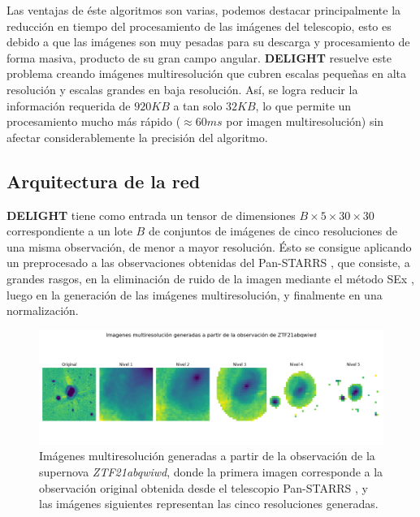\documentclass[../tesis.tex]{subfiles}
\begin{document}
Las ventajas de éste algoritmos son varias, podemos destacar principalmente la reducción en tiempo del procesamiento de las imágenes del telescopio, esto es debido a que las imágenes son muy pesadas para su descarga y procesamiento de forma masiva, producto de su gran campo angular. \textbf{DELIGHT} resuelve este problema creando imágenes multiresolución que cubren escalas pequeñas en alta resolución y escalas grandes en baja resolución. Así, se logra reducir la información requerida de $920KB$ a tan solo $32KB$, lo que permite un procesamiento mucho más rápido ($\approx 60 ms$ por imagen multiresolución) sin afectar considerablemente la precisión del algoritmo.\par\null\par

\subsection{Arquitectura de la red}

\textbf{DELIGHT} tiene como entrada un tensor de dimensiones $B\times5\times30\times30$ correspondiente a un lote $B$ de conjuntos de imágenes de cinco resoluciones de una misma observación, de menor a mayor resolución. Ésto se consigue aplicando un preprocesado a las observaciones obtenidas del Pan-STARRS \cite{panstarrs}, que consiste, a grandes rasgos, en la eliminación de ruido de la imagen mediante el método SEx \cite{sextractor}, luego en la generación de las imágenes multiresolución, y finalmente en una normalización. \par\null\par

\begin{figure}[h!]
    \centering
    \includegraphics[width=1\linewidth]{images/introduction/delight_input_example.png}
    \caption{Imágenes multiresolución generadas a partir de la observación de la supernova \textit{ZTF21abqwiwd}, donde la primera imagen corresponde a la observación original obtenida desde el telescopio Pan-STARRS \cite{panstarrs}, y las imágenes siguientes representan las cinco resoluciones generadas.}
    \label{fig:delight-input}
\end{figure}
\end{document}
